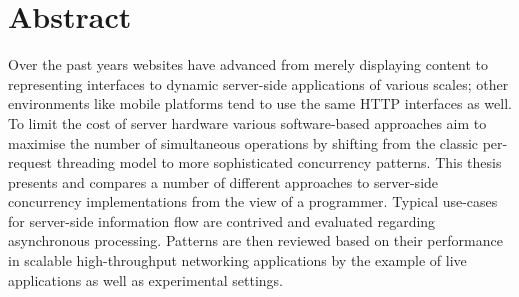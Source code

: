 \chapter{Abstract}

Over the past years websites have advanced from merely displaying content to representing interfaces to dynamic server-side applications of various scales; other environments like mobile platforms tend to use the same HTTP interfaces as well. To limit the cost of server hardware various software-based approaches aim to maximise the number of simultaneous operations by shifting from the classic per-request threading model to more sophisticated concurrency patterns. This thesis presents and compares a number of different approaches to server-side concurrency implementations from the view of a programmer. Typical use-cases for server-side information flow are contrived and evaluated regarding asynchronous processing. Patterns are then reviewed based on their performance in scalable high-throughput networking applications by the example of live applications as well as experimental settings.